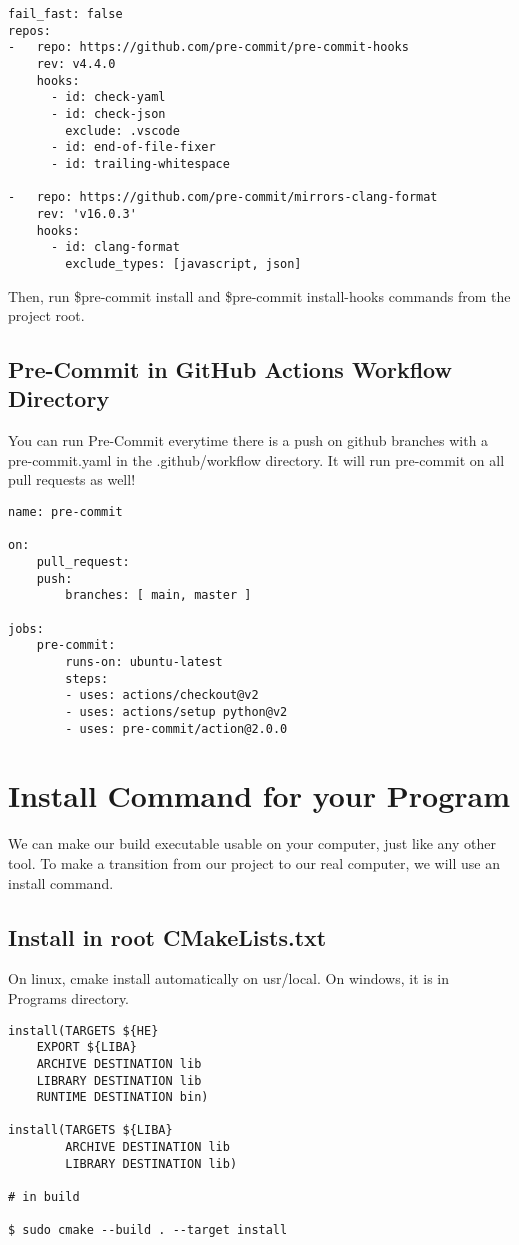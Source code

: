 \documentclass[openany]{report}
\begin{document}
\begin{verbatim}
fail_fast: false
repos:
-   repo: https://github.com/pre-commit/pre-commit-hooks
    rev: v4.4.0
    hooks:
      - id: check-yaml
      - id: check-json
        exclude: .vscode
      - id: end-of-file-fixer
      - id: trailing-whitespace

-   repo: https://github.com/pre-commit/mirrors-clang-format
    rev: 'v16.0.3'
    hooks:
      - id: clang-format
        exclude_types: [javascript, json]
\end{verbatim}

Then, run \$pre-commit install and \$pre-commit install-hooks commands from the project root.


\subsection{Pre-Commit in GitHub Actions Workflow Directory}

You can run Pre-Commit everytime there is a push on github branches with a pre-commit.yaml in the .github/workflow 
directory. It will run pre-commit on all pull requests as well!

\begin{verbatim}
name: pre-commit

on:
    pull_request:
    push:
        branches: [ main, master ]

jobs:
    pre-commit:
        runs-on: ubuntu-latest
        steps:
        - uses: actions/checkout@v2
        - uses: actions/setup python@v2
        - uses: pre-commit/action@2.0.0
\end{verbatim}


\section{Install Command for your Program}

We can make our build executable usable on your computer, just like any other tool. To make a transition from 
our project to our real computer, we will use an install command.


\subsection{Install in root CMakeLists.txt}

On linux, cmake install automatically on usr/local. On windows, it is in Programs directory.

\begin{verbatim}
install(TARGETS ${HE}
    EXPORT ${LIBA}
    ARCHIVE DESTINATION lib
    LIBRARY DESTINATION lib
    RUNTIME DESTINATION bin) 

install(TARGETS ${LIBA}
        ARCHIVE DESTINATION lib
        LIBRARY DESTINATION lib)

# in build

$ sudo cmake --build . --target install
\end{verbatim}
\end{document}

